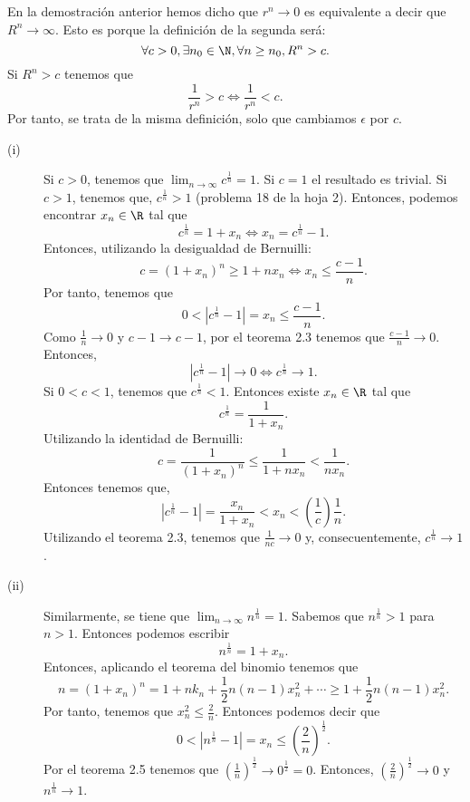\begin{observation}
\normalfont En la demostración anterior hemos dicho que $\displaystyle r^{n} \to 0 $ es equivalente a decir que $\displaystyle R^{n} \to \infty $. Esto es porque la definición de la segunda será:
\[\forall c > 0, \exists n_{0}\in\N, \forall n \geq n_{0}, R^{n} > c .\]
Si $\displaystyle R^{n} > c $ tenemos que 
\[\frac{1}{r^{n}} > c \iff \frac{1}{r^{n}} < c .\]
Por tanto, se trata de la misma definición, solo que cambiamos $\displaystyle \epsilon  $  por $\displaystyle c $.
\end{observation}

\begin{eg}
\normalfont 
\begin{description}
\item[(i)] Si $\displaystyle c > 0 $, tenemos que $\displaystyle \lim_{n \to \infty}c^{\frac{1}{n}}=1 $. Si $\displaystyle c = 1 $ el resultado es trivial. Si $\displaystyle c > 1 $, tenemos que, $\displaystyle c^{\frac{1}{n}} > 1 $ (problema 18 de la hoja 2). Entonces, podemos encontrar $\displaystyle x_{n} \in \R $ tal que 
	\[ c^{\frac{1}{n}} = 1 + x_{n} \iff x_{n} = c^{\frac{1}{n}}-1 .\]
Entonces, utilizando la desigualdad de Bernuilli:
\[c = \left(1 + x_{n}\right)^{n} \geq 1 + nx_{n} \iff x_{n} \leq \frac{c-1}{n} .\]
Por tanto, tenemos que
\[ 0 < \left|c^{\frac{1}{n}}-1\right| = x_{n} \leq \frac{c-1}{n} .\]
Como $\displaystyle \frac{1}{n} \to 0 $ y $\displaystyle c-1 \to c-1 $, por el teorema 2.3 tenemos que $\displaystyle \frac{c-1}{n} \to 0 $. Entonces, 
\[ \left|c^{\frac{1}{n}}-1\right| \to 0 \iff c^{\frac{1}{n}} \to 1 .\]
Si $\displaystyle 0 < c < 1 $, tenemos que $\displaystyle c^{\frac{1}{n}} < 1 $. Entonces existe $\displaystyle x_{n} \in \R $ tal que 
\[ c^{\frac{1}{n}} = \frac{1}{1 + x_{n}} .\]
Utilizando la identidad de Bernuilli:
\[ c = \frac{1}{\left(1 + x_{n}\right)^{n}} \leq \frac{1}{1 + nx_{n}} < \frac{1}{nx_{n}} .\]
Entonces tenemos que, 
\[ \left|c^{\frac{1}{n}}-1\right| = \frac{x_{n}}{1 + x_{n}} < x_{n} < \left(\frac{1}{c}\right)\frac{1}{n} .\]
Utilizando el teorema 2.3, tenemos que $\displaystyle \frac{1}{nc} \to 0 $ y, consecuentemente, $\displaystyle c^{\frac{1}{n}} \to 1 $.
\item[(ii)] Similarmente, se tiene que $\displaystyle \lim_{n \to \infty}n^{\frac{1}{n}} = 1 $. Sabemos que $\displaystyle n^{\frac{1}{n}} > 1 $ para $\displaystyle n > 1 $. Entonces podemos escribir
	\[n^{\frac{1}{n}} = 1 + x_{n} .\]
Entonces, aplicando el teorema del binomio tenemos que 
\[n = \left(1 + x_{n}\right)^{n} = 1 + nk_{n}+\frac{1}{2}n\left(n-1\right)x_{n}^{2} + \cdots \geq 1 + \frac{1}{2}n\left(n-1\right)x_{n}^{2} .\]
Por tanto, tenemos que $\displaystyle x_{n}^{2} \leq \frac{2}{n} $. Entonces podemos decir que
\[ 0 < \left|n^{\frac{1}{n}}-1\right| = x_{n} \leq \left(\frac{2}{n}\right)^{\frac{1}{2}} .\]
Por el teorema 2.5 tenemos que $\displaystyle \left(\frac{1}{n}\right)^{\frac{1}{2}} \to 0^{\frac{1}{2}} = 0 $. Entonces, $\displaystyle \left(\frac{2}{n}\right)^{\frac{1}{2}} \to 0 $ y $\displaystyle n^{\frac{1}{n}} \to 1 $.
\end{description}
\end{eg}

